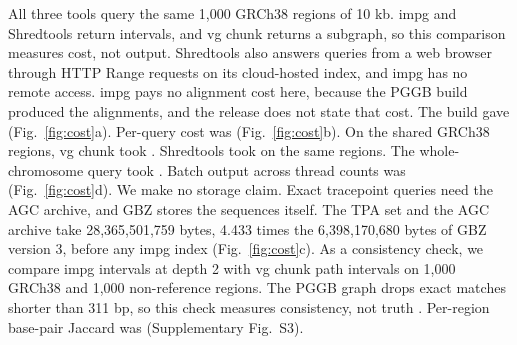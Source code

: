 All three tools query the same 1,000 GRCh38 regions of 10 kb.
impg and Shredtools return intervals, and vg chunk returns a subgraph, so this comparison measures cost, not output.
Shredtools also answers queries from a web browser through HTTP Range requests on its cloud-hosted index, and impg has no remote access.
impg pays no alignment cost here, because the PGGB build produced the alignments, and the release does not state that cost.
The build gave  (Fig.~\ref{fig:cost}a).
Per-query cost was  (Fig.~\ref{fig:cost}b).
On the shared GRCh38 regions, vg chunk took .
Shredtools took  on the same regions.
The whole-chromosome query took .
Batch output across thread counts was  (Fig.~\ref{fig:cost}d).
We make no storage claim.
Exact tracepoint queries need the AGC archive, and GBZ stores the sequences itself.
The TPA set and the AGC archive take 28,365,501,759 bytes, 4.433 times the 6,398,170,680 bytes of GBZ version 3, before any impg index (Fig.~\ref{fig:cost}c).
As a consistency check, we compare impg intervals at depth 2 with vg chunk path intervals on 1,000 GRCh38 and 1,000 non-reference regions.
The PGGB graph drops exact matches shorter than 311 bp, so this check measures consistency, not truth \citep{Garrison2023seqwish,Garrison2024pggb}.
Per-region base-pair Jaccard was  (Supplementary Fig.~S3).

